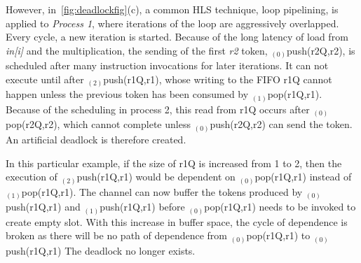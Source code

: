 However, in~\ref{fig:deadlockfig}(c), 
a common HLS technique, loop pipelining, is applied to \textit{Process 1}, where
iterations of the loop are aggressively overlapped. Every cycle, a new iteration is started. Because of the long latency of load from \textit{in[i]} and
the multiplication, the sending of the first \textit{r2} token, $_{(0)}$push(r2Q,r2), is scheduled
after many instruction invocations for later iterations. It can not execute until after $_{(2)}$push(r1Q,r1), whose
writing to the FIFO r1Q cannot happen unless the previous token has been consumed by 
$_{(1)}$pop(r1Q,r1). Because of the scheduling in process 2, this read from r1Q
occurs after $_{(0)}$pop(r2Q,r2), which cannot complete unless $_{(0)}$push(r2Q,r2)
can send the token.  An artificial deadlock is therefore created. 

In this particular example, if the size of r1Q is increased
from 1 to 2, then the execution of $_{(2)}$push(r1Q,r1) would be dependent on 
$_{(0)}$pop(r1Q,r1) instead of $_{(1)}$pop(r1Q,r1). The
channel can now buffer the tokens produced by $_{(0)}$push(r1Q,r1) and $_{(1)}$push(r1Q,r1) before $_{(0)}$pop(r1Q,r1) needs to be invoked to create empty slot. With this increase in buffer space, the cycle of dependence is broken as there will be no path of dependence from 
$_{(0)}$pop(r1Q,r1) to $_{(0)}$push(r1Q,r1)
The deadlock no longer exists.




